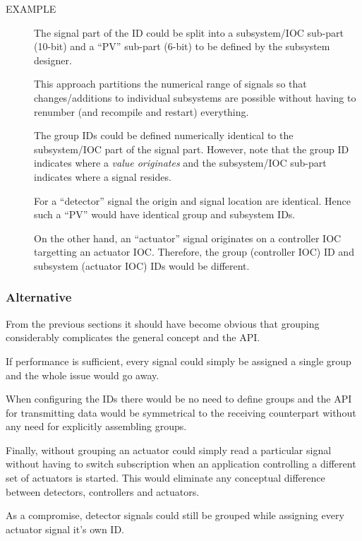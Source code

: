 \documentclass[11pt]{article}
\newcommand{\group}{group}
\newcommand{\signal}{signal}
\newcommand{\example}[1]{
	\begin{description}
		\item[EXAMPLE] #1
	\end{description}
}
\begin{document}
		\example{The \signal{} part of the ID could be split
          into a subsystem/IOC sub-part (10-bit) and a ``PV'' sub-part
          (6-bit) to be defined by the subsystem designer.

          This approach partitions the numerical range of
          \signal{}s so that changes/additions to individual
          subsystems are possible without having to renumber
          (and recompile and restart) everything.

          The \group{} IDs could be defined numerically identical
          to the subsystem/IOC part of the \signal{} part.
          However, note that the \group{} ID indicates
          where a {\em value originates} and the subsystem/IOC
          sub-part indicates where a \signal{} resides.

          For a ``detector'' \signal{} the origin and \signal{}
          location are identical. Hence such a ``PV'' would have identical
          \group{} and subsystem IDs.

          On the other hand, an ``actuator'' \signal{} originates
          on a controller IOC targetting an actuator IOC.
          Therefore, the \group{} (controller IOC) ID and
          subsystem (actuator IOC) IDs would
          be different.
        }

  \subsubsection{Alternative}
  From the previous sections it should have become obvious
  that grouping considerably complicates the general concept
  and the API. 

  If performance is sufficient, every \signal{} could simply
  be assigned a single \group{} and the whole issue would
  go away.

  When configuring the IDs there would be no need to define
  groups and the API for transmitting data would be symmetrical
  to the receiving counterpart without any need for explicitly
  assembling groups.

  Finally, without grouping an actuator could simply read
  a particular signal without having to switch subscription
  when an application controlling a different set of actuators
  is started. This would eliminate any conceptual difference
  between detectors, controllers and actuators.

  As a compromise, detector signals could still be \group{}ed
  while assigning every actuator signal it's own ID.
\end{document}
